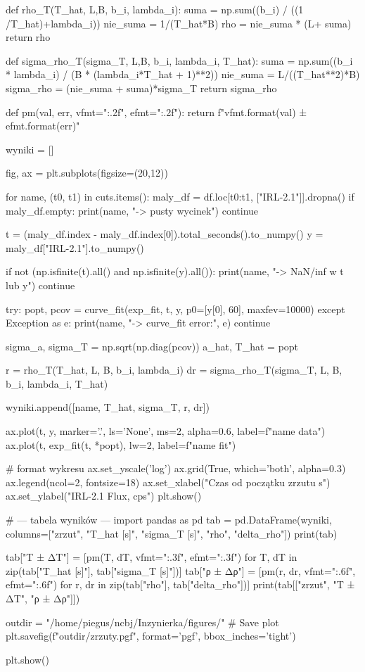 \begin{python}
def rho_T(T_hat, L,B, b_i, lambda_i):
suma = np.sum((b_i) / ((1 /T_hat)+lambda_i))
nie_suma = 1/(T_hat*B)
rho = nie_suma * (L+ suma)
return rho

def sigma_rho_T(sigma_T, L,B, b_i, lambda_i, T_hat):
suma = np.sum((b_i * lambda_i) / (B * (lambda_i*T_hat + 1)**2))
nie_suma = L/((T_hat**2)*B)
sigma_rho = (nie_suma + suma)*sigma_T
return sigma_rho

def pm(val, err, vfmt="{:.2f}", efmt="{:.2f}"):
return f"{vfmt.format(val)} ± {efmt.format(err)}"

wyniki = []

fig, ax = plt.subplots(figsize=(20,12))

for name, (t0, t1) in cuts.items():
maly_df = df.loc[t0:t1, ["IRL-2.1"]].dropna()
if maly_df.empty:
print(name, "-> pusty wycinek")
continue

t = (maly_df.index - maly_df.index[0]).total_seconds().to_numpy()
y = maly_df["IRL-2.1"].to_numpy()

if not (np.isfinite(t).all() and np.isfinite(y).all()):
print(name, "-> NaN/inf w t lub y")
continue


try:
popt, pcov = curve_fit(exp_fit, t, y, p0=[y[0], 60], maxfev=10000)
except Exception as e:
print(name, "-> curve_fit error:", e)
continue

sigma_a, sigma_T = np.sqrt(np.diag(pcov))
a_hat, T_hat = popt

r  = rho_T(T_hat, L, B, b_i, lambda_i)
dr = sigma_rho_T(sigma_T, L, B, b_i, lambda_i, T_hat)

wyniki.append([name, T_hat, sigma_T, r, dr])

ax.plot(t, y, marker='.', ls='None', ms=2, alpha=0.6, label=f"{name} data")
ax.plot(t, exp_fit(t, *popt), lw=2, label=f"{name} fit")

# format wykresu
ax.set_yscale('log')
ax.grid(True, which='both', alpha=0.3)
ax.legend(ncol=2, fontsize=18)
ax.set_xlabel("Czas od początku zrzutu s")
ax.set_ylabel("IRL-2.1 Flux, cps")
plt.show()

# --- tabela wyników ---
import pandas as pd
tab = pd.DataFrame(wyniki, columns=["zrzut", "T_hat [s]", "sigma_T [s]", "rho", "delta_rho"])
print(tab)

tab["T ± ΔT"]   = [pm(T, dT, vfmt="{:.3f}", efmt="{:.3f}") for T, dT in zip(tab["T_hat [s]"], tab["sigma_T [s]"])]
tab["ρ ± Δρ"]   = [pm(r, dr, vfmt="{:.6f}", efmt="{:.6f}") for r, dr in zip(tab["rho"], tab["delta_rho"])]
print(tab[["zrzut", "T ± ΔT", "ρ ± Δρ"]])


outdir = "/home/piegus/ncbj/Inzynierka/figures/"
# Save plot
plt.savefig(f"{outdir}/zrzuty.pgf", format='pgf', bbox_inches='tight')

plt.show()

\end{python}
